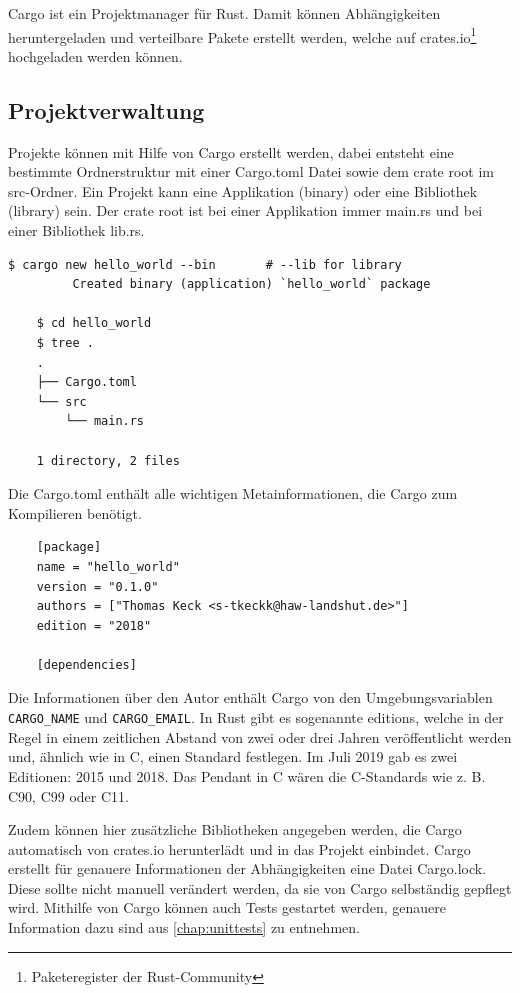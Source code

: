 Cargo ist ein Projektmanager für Rust. Damit können Abhängigkeiten heruntergeladen und verteilbare Pakete erstellt werden, welche auf crates.io\footnote{Paketeregister der Rust-Community} hochgeladen werden können. \cite{CargoBook}

\subsection{Projektverwaltung}

Projekte können mit Hilfe von Cargo erstellt werden, dabei entsteht eine bestimmte Ordnerstruktur mit einer Cargo.toml Datei sowie dem crate root im src-Ordner. Ein Projekt kann eine Applikation (binary) oder eine Bibliothek (library) sein. Der crate root ist bei einer Applikation immer \glqq main.rs\grqq{} und bei einer Bibliothek \glqq lib.rs\grqq{}.

\begin{lstlisting}[style=tree]
    $ cargo new hello_world --bin       # --lib for library
         Created binary (application) `hello_world` package

    $ cd hello_world
    $ tree .
    .
    ├── Cargo.toml
    └── src
        └── main.rs
    
    1 directory, 2 files
\end{lstlisting}

Die Cargo.toml enthält alle wichtigen Metainformationen, die Cargo zum Kompilieren benötigt. 

\begin{lstlisting}
    [package]
    name = "hello_world"
    version = "0.1.0"
    authors = ["Thomas Keck <s-tkeckk@haw-landshut.de>"]
    edition = "2018"
    
    [dependencies]    
\end{lstlisting}

Die Informationen über den Autor enthält Cargo von den Umgebungsvariablen \verb"CARGO_NAME" und \verb"CARGO_EMAIL". In Rust gibt es sogenannte editions, welche in der Regel in einem zeitlichen Abstand von zwei oder drei Jahren veröffentlicht werden und, ähnlich wie in C, einen Standard festlegen. Im Juli 2019 gab es zwei Editionen: 2015 und 2018. Das Pendant in C wären die C-Standards wie z. B. C90, C99 oder C11.

Zudem können hier zusätzliche Bibliotheken angegeben werden, die Cargo automatisch von crates.io herunterlädt und in das Projekt einbindet. Cargo erstellt für genauere Informationen der Abhängigkeiten eine Datei Cargo.lock. Diese sollte nicht manuell verändert werden, da sie von Cargo selbständig gepflegt wird. Mithilfe von Cargo können auch Tests gestartet werden, genauere Information dazu sind aus \autoref{chap:unittests} zu entnehmen.

